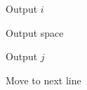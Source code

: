 \begin{algorithm}
\caption{Display Number Pattern}
\begin{algorithmic}[1]


        \STATE Output $i$
    \ENDFOR

    \STATE Output space

        \STATE Output $j$
    \ENDFOR

    \STATE Move to next line

\ENDFOR

\end{algorithmic}
\end{algorithm}
